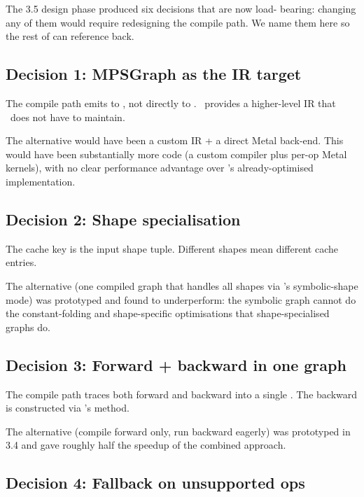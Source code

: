 The 3.5 design phase produced six decisions that are now load-
bearing: changing any of them would require redesigning the
compile path. We name them here so the rest of
 can reference back.

\subsection{Decision 1: MPSGraph as the IR target}
\label{ssec:compile_design:decision_mpsgraph}

The compile path emits to \MPSGraph, not directly to \Metal.
\MPSGraph\ provides a higher-level IR that \Lucid\ does not have
to maintain.

The alternative would have been a custom IR + a direct Metal
back-end. This would have been substantially more code (a
custom compiler plus per-op Metal kernels), with no clear
performance advantage over \MPSGraph's already-optimised
implementation.

\subsection{Decision 2: Shape specialisation}
\label{ssec:compile_design:decision_shape_spec}

The cache key is the input shape tuple. Different shapes mean
different cache entries.

The alternative (one compiled graph that handles all shapes via
\MPSGraph's symbolic-shape mode) was prototyped and found to
underperform: the symbolic graph cannot do the constant-folding
and shape-specific optimisations that shape-specialised graphs
do.

\subsection{Decision 3: Forward + backward in one graph}
\label{ssec:compile_design:decision_fwd_bwd_single}

The compile path traces both forward and backward into a single
\MPSGraph. The backward is constructed via \MPSGraph's
 method.

The alternative (compile forward only, run backward eagerly) was
prototyped in 3.4 and gave roughly half the speedup of the
combined approach.

\subsection{Decision 4: Fallback on unsupported ops}
\label{ssec:compile_design:decision_fallback}

